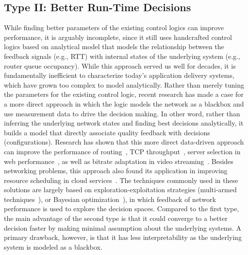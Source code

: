
\subsection{Type II: Better Run-Time Decisions}
\label{subsec:related:data:type2}

While finding better parameters of the existing control logics
can improve performance, it is arguably incomplete, since it still uses 
handcrafted control logics based on analytical model that models the 
relationship between the feedback signals (e.g., RTT) with internal states of the 
underlying system (e.g., router queue occupancy). 
While this approach served us well for decades, it is fundamentally inefficient 
to characterize today's application delivery systems, which have grown too 
complex to model analytically. Rather than merely tuning the parameters for 
the existing control logic, recent research has made a case for a 
more direct approach in which the logic models the network as a 
blackbox and use measurement data to drive the decision making.
In other word, rather than inferring the underlying network states and finding
best decisions analytically, it builds a model that directly associate quality
feedback with decisions (configurations).
Research has shown that this more direct data-driven 
approach can improve the performance of routing~\cite{schapira2010putting},
TCP throughput~\cite{pcc}, server selection in web 
performance~\cite{footprint}, as well as bitrate adaptation in 
video streaming~\cite{neural-streaming}.
Besides networking problems, this approach also found its
application in improving resource scheduling in 
cloud services~\cite{cherrypick}.
The techniques commonly used in these solutions are largely based on 
exploration-exploitation strategies (multi-armed techniques~\cite{mab}), or 
Bayesian optimization~\cite{bayesian-optimization}), in which feedback of 
network performance is used to explore the decision spaces.
Compared to the first type, the main advantage of the 
second type is that it could converge to a better decision
faster by making minimal assumption about the 
underlying  systems. 
A primary drawback, however, is that it has less interpretability
as the underlying system is modeled as a blackbox.


